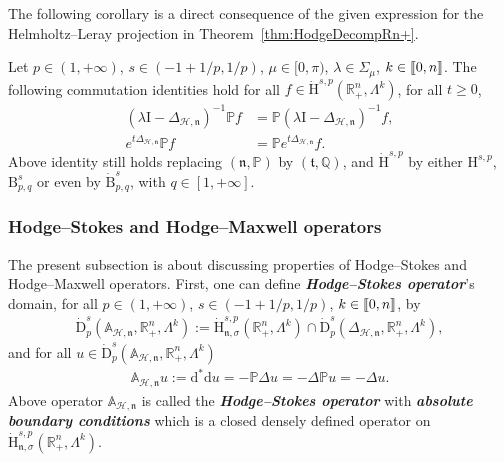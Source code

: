 \documentclass[AHL,Unicode,longabstracts,published]{cedram}
\newcommand{\bbP}{\mathbb{P}}
\newcommand{\bbA}{\mathbb{A}}
\newcommand{\bbR}{\mathbb{R}}
\newcommand{\bbQ}{\mathbb{Q}}
\newcommand{\rmH}{\mathrm{H}}%
\newcommand{\rmB}{\mathrm{B}}
\newcommand{\rmd}{\mathrm{d}}
\newcommand{\rmD}{\mathrm{D}}
\newcommand{\rmI}{\mathrm{I}}
\newcommand{\clH}{\mathcal{H}}
\newcommand{\fkn}{\mathfrak{n}}
\newcommand{\fkt}{\mathfrak{t}}
\newcommand{\llbracket}{\mathopen{[\mkern -2.7mu[}}
\newcommand{\rrbracket}{\mathclose{]\mkern -2.7mu]}}
\newcommand{\llb}{\llbracket}
\newcommand{\rrb}{\rrbracket}
\begin{document}
The following corollary is a direct consequence of the given expression for the Helmholtz--Leray projection in Theorem~\ref{thm:HodgeDecompRn+}.

\begin{coro}\label{cor:commutrelationHodgeProjectorHspBspqRn+}
Let $p\in(1,+\infty)$, $s\in(-1+1/p,1/p)$,
$\mu\in[0,\pi)$, $\lambda\in\Sigma_\mu$, $k\in\llb 0,n\rrb$. The following commutation identities hold for all $f\in\dot{\rmH}^{s,p}(\bbR^n_+,\Lambda^k)$, for all $t\geqslant 0$,
\begin{align*}
\left(\lambda \rmI -\Delta_{\clH,\fkn}\right)^{-1} \bbP f &= \bbP\left(\lambda \rmI -\Delta_{\clH,\fkn}\right)^{-1} f ,\\
e^{t\Delta_{\clH,\fkn}} \bbP f &= \bbP e^{t\Delta_{\clH,\fkn}} f .
\end{align*}
Above identity still holds replacing $(\fkn,\bbP)$ by $(\fkt,\bbQ)$, and $\dot{\rmH}^{s,p}$ by either ${\rmH}^{s,p}$, ${\rmB}^s_{p,q}$ or even by $\dot{\rmB}^s_{p,q}$, with $q\in[1,+\infty]$.
\end{coro}

\subsubsection{Hodge--Stokes and Hodge--Maxwell operators}

The present subsection is about discussing properties of Hodge--Stokes and Hodge--Maxwell operators. First, one can define \textbf{\emph{Hodge--Stokes operator}}'s domain, for all $p\in(1,+\infty)$, $s\in(-1+1/p,1/p)$, $k\in\llb 0,n\rrb$, by
\begin{align}\label{eq:domainHodgeStokesAbsBC}
\dot{\rmD}^{s}_{p}\left(\bbA_{\clH,\fkn},\bbR^n_+,\Lambda^k\right):= \dot{\rmH}^{s,p}_{\fkn,\sigma}\left(\bbR^n_+,\Lambda^k\right)\cap\dot{\rmD}^{s}_{p}\left(\Delta_{\clH,\fkn},\bbR^n_+,\Lambda^k\right),
\end{align}
and for all $u\in \dot{\rmD}^{s}_{p}(\bbA_{\clH,\fkn},\bbR^n_+,\Lambda^k)$
\begin{align}\label{eq:defHodgeStokesAbsBC}
\bbA_{\clH,\fkn} u:= \rmd^\ast\rmd u = -\bbP\Delta u = -\Delta \bbP u =-\Delta u .
\end{align}
Above operator $\bbA_{\clH,\fkn}$ is called the \textbf{\emph{Hodge--Stokes operator}} with \textbf{\emph{absolute boundary conditions}} which is a closed densely defined operator on $\dot{\rmH}^{s,p}_{{\fkn},\sigma}(\bbR^n_+,\Lambda^k)$.
\end{document}
